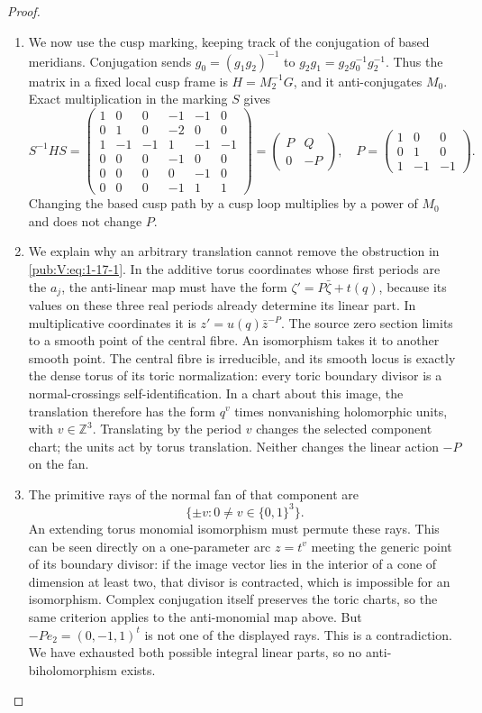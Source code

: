 \documentclass[11pt,a4paper]{article}
\numberwithin{equation}{section}
\theoremstyle{definition}
\begin{document}
\begin{proof}
\begin{enumerate}[label=\arabic*.]
\item We now use the cusp marking, keeping track of the conjugation of based meridians.  Conjugation sends
$g_0=(g_1g_2)^{-1}$ to $g_2g_1=g_2g_0^{-1}g_2^{-1}$.
Thus the matrix in a fixed local cusp frame is
$H=M_2^{-1}G$, and it anti-conjugates $M_0$.
Exact multiplication in the marking $S$ gives
\begin{equation}
S^{-1}HS=
\begin{pmatrix}
1&0&0&-1&-1&0\\
0&1&0&-2&0&0\\
1&-1&-1&1&-1&-1\\
0&0&0&-1&0&0\\
0&0&0&0&-1&0\\
0&0&0&-1&1&1
\end{pmatrix}
=\begin{pmatrix}P&Q\\0&-P\end{pmatrix},\quad
P=\begin{pmatrix}1&0&0\\0&1&0\\1&-1&-1\end{pmatrix}.
\label{pub:V:eq:1-17-1}
\end{equation}
Changing the based cusp path by a cusp loop multiplies by a power of
$M_0$ and does not change $P$.

\item We explain why an arbitrary translation cannot remove the obstruction
in \eqref{pub:V:eq:1-17-1}.  In the additive torus coordinates whose first periods
are the $a_j$, the anti-linear map must have the form
$\zeta' =P\bar\zeta+t(q)$, because its values on these three real
periods already determine its linear part.  In multiplicative
coordinates it is
$z'=u(q)\bar z^{-P}$.
The source zero section limits to a smooth point of the central fibre.
An isomorphism takes it to another smooth point.  The central fibre
is irreducible, and its smooth locus is exactly the dense torus of
its toric normalization: every toric boundary divisor is a
normal-crossings self-identification.  In a chart about this image,
the translation therefore has the form $q^v$ times nonvanishing
holomorphic units, with $v\in\mathbb Z^3$.  Translating by the period
$v$ changes the selected component chart; the units act by torus
translation.  Neither changes the linear action $-P$ on the fan.

\item The primitive rays of the normal fan of that component are
\[
\{\pm v:0\ne v\in\{0,1\}^3\}.
\]
An extending torus monomial isomorphism must permute these rays.
This can be seen directly on a one-parameter arc $z=t^v$ meeting the
generic point of its boundary divisor: if the image vector lies in
the interior of a cone of dimension at least two, that divisor is
contracted, which is impossible for an isomorphism.  Complex
conjugation itself preserves the toric charts, so the same criterion
applies to the anti-monomial map above.
But $-Pe_2=(0,-1,1)^t$ is not one of the displayed rays.
This is a contradiction.  We have exhausted both possible integral
linear parts, so no anti-biholomorphism exists.



\end{enumerate}
\end{proof}
\end{document}
